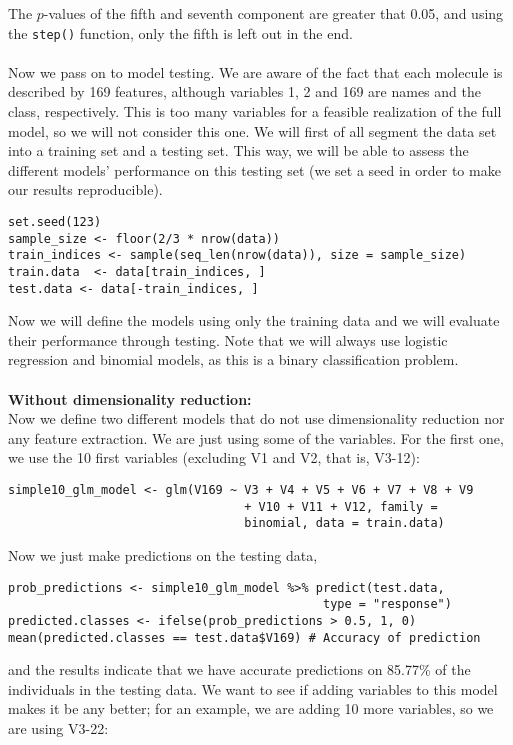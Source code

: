\documentclass[10pt]{article}
\begin{document}
The $p$-values of the fifth and seventh component are greater that 0.05, and using the \verb|step()| function, only the fifth is left out in the end.
\\ \ \\
Now we pass on to model testing. We are aware of the fact that each molecule is described by 169 features, although variables 1, 2 and 169 are names and the class, respectively. This is too many variables for a feasible realization of the full model, so we will not consider this one. We will first of all segment the data set into a training set and a testing set. This way, we will be able to assess the different models' performance on this testing set (we set a seed in order to make our results reproducible).
\begin{verbatim}
set.seed(123)
sample_size <- floor(2/3 * nrow(data))
train_indices <- sample(seq_len(nrow(data)), size = sample_size)
train.data  <- data[train_indices, ]
test.data <- data[-train_indices, ]
\end{verbatim}
Now we will define the models using only the training data and we will evaluate their performance through testing. Note that we will always use logistic regression and binomial models, as this is a binary classification problem.
\\ \ \\
\Large{\textbf{Without dimensionality reduction:}}\\
Now we define two different models that do not use dimensionality reduction nor any feature extraction. We are just using some of the variables. For the first one, we use the 10 first variables (excluding V1 and V2, that is, V3-12):
\begin{verbatim}
simple10_glm_model <- glm(V169 ~ V3 + V4 + V5 + V6 + V7 + V8 + V9
                                 + V10 + V11 + V12, family =
                                 binomial, data = train.data)
\end{verbatim}
Now we just make predictions on the testing data,
\begin{verbatim}
prob_predictions <- simple10_glm_model %>% predict(test.data,
                                            type = "response")
predicted.classes <- ifelse(prob_predictions > 0.5, 1, 0)
mean(predicted.classes == test.data$V169) # Accuracy of prediction
\end{verbatim}
and the results indicate that we have accurate predictions on 85.77\% of the individuals in the testing data. We want to see if adding variables to this model makes it be any better; for an example, we are adding 10 more variables, so we are using V3-22:
\end{document}
